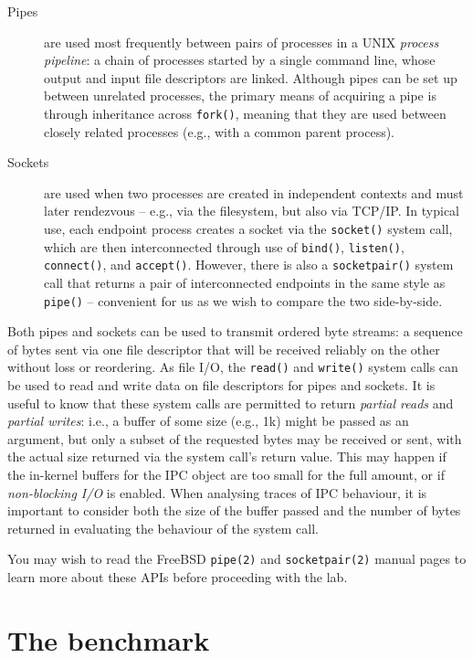 \documentclass[a4paper,10pt]{article}
\begin{document}
\begin{description}
\item[Pipes] are used most frequently between pairs of processes in a UNIX
\textit{process pipeline}: a chain of processes started by a single command
line, whose output and input file descriptors are linked.
Although pipes can be set up between unrelated processes, the primary means of
acquiring a pipe is through inheritance across \texttt{fork()}, meaning that
they are used between closely related processes (e.g., with a common parent
process).

\item[Sockets] are used when two processes are created in independent contexts
and must later rendezvous -- e.g., via the filesystem, but also via TCP/IP.
In typical use, each endpoint process creates a socket via the
\texttt{socket()} system call, which are then interconnected through use of
\texttt{bind()}, \texttt{listen()}, \texttt{connect()}, and \texttt{accept()}.
However, there is also a \texttt{socketpair()} system call that returns a pair
of interconnected endpoints in the same style as \texttt{pipe()} -- convenient
for us as we wish to compare the two side-by-side.
\end{description}

Both pipes and sockets can be used to transmit ordered byte streams: a
sequence of bytes sent via one file descriptor that will be received reliably
on the other without loss or reordering.
As file I/O, the \texttt{read()} and \texttt{write()} system calls can be used
to read and write data on file descriptors for pipes and sockets.
It is useful to know that these system calls are permitted to return
\textit{partial reads} and \textit{partial writes}: i.e., a buffer of some
size (e.g., 1k) might be passed as an argument, but only a subset of the
requested bytes may be received or sent, with the actual size returned via the
system call's return value.
This may happen if the in-kernel buffers for the IPC object are too small for
the full amount, or if \textit{non-blocking I/O} is enabled.
When analysing traces of IPC behaviour, it is important to consider both the
size of the buffer passed and the number of bytes returned in evaluating the
behaviour of the system call.

You may wish to read the FreeBSD \texttt{pipe(2)} and \texttt{socketpair(2)}
manual pages to learn more about these APIs before proceeding with the lab.

\section*{The benchmark}
\end{document}
